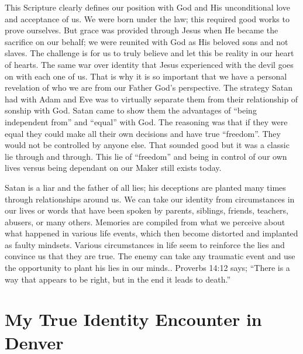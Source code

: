 \documentclass[oneside]{book}
\begin{document}
This Scripture clearly defines our position with God and His unconditional love and acceptance of us. We were born under the law; this required good works to prove ourselves. But grace was provided through Jesus when He became the sacrifice on our behalf; we were reunited with God as His beloved sons and not slaves. The challenge is for us to truly believe and let this be reality in our heart of hearts. The same war over identity that Jesus experienced with the devil goes on with each one of us. That is why it is so important that we have a personal revelation of who we are from our Father God’s perspective. The strategy Satan had with Adam and Eve was to virtually separate them from their relationship of sonship with God. Satan came to show them the advantages of “being independent from” and “equal” with God. The reasoning was that if they were equal they could make all their own decisions and have true “freedom”. They would not be controlled by anyone else. That sounded good but it was a classic lie through and through. This lie of “freedom” and being in control of our own lives versus being dependant on our Maker still exists today. 

Satan is a liar and the father of all lies; his deceptions are planted many times through relationships around us. We can take our identity from circumstances in our lives or words that have been spoken by parents, siblings, friends, teachers, abusers, or many others. Memories are compiled from what we perceive about what happened in various life events, which then become distorted and implanted as faulty mindsets. Various circumstances in life seem to reinforce the lies and convince us that they are true. The enemy can take any traumatic event and use the opportunity to plant his lies in our minds.. Proverbs 14:12 says; “There is a way that appears to be right, but in the end it leads to death.” 


\section{My True Identity Encounter in Denver}
\
\end{document}
